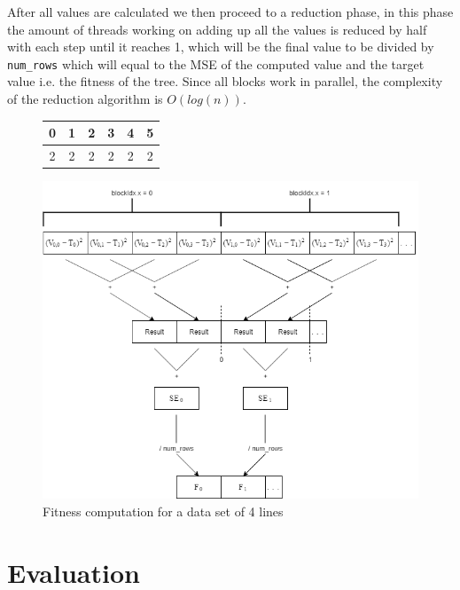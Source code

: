 \documentclass[runningheads]{llncs}
\begin{document}
After all values are calculated we then proceed to a reduction phase, in this phase the amount of threads working on adding up all the values is reduced by half with each step until it reaches 1, which will be the final value to be divided by \texttt{num\_rows} which will equal to the MSE of the computed value and the target value i.e. the fitness of the tree. Since all blocks work in parallel, the complexity of the reduction algorithm is $O(log(n))$.

\begin{figure}[!htb]
\begin{center}
 \begin{tabular}{|c|c|c|c|c|c|}
 \hline
 0 & 1 & 2 & 3 & 4 & 5\\
 \hline
 2 & 2 & 2 & 2 & 2 & 2\\
 \hline
\end{tabular}
\end{center}
\end{figure}

\begin{figure}[!htb]
\begin{center}
\includegraphics[scale=0.35]{Fitness_Calculation1}
\end{center}
\caption{Fitness computation for a data set of 4 lines}
\label{fitness_calc}
\end{figure}

\section{Evaluation}
\end{document}
